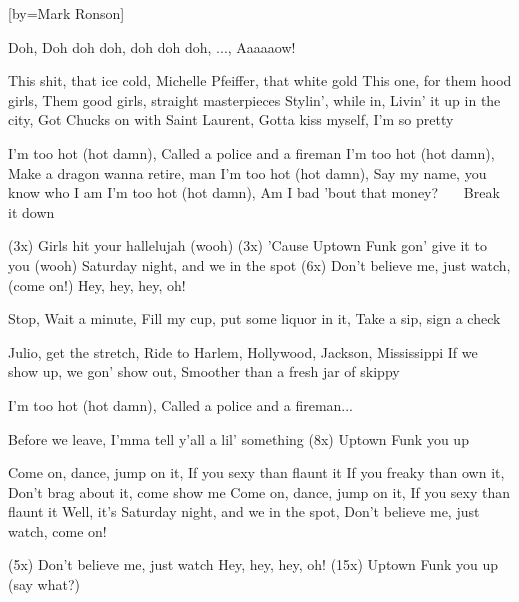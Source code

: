 
[by=Mark Ronson]




\beginverse
Doh, Doh doh doh, doh doh doh, ..., Aaaaaow!
\endverse

\beginverse
This shit, that ice cold, Michelle Pfeiffer, that white gold
This one, for them hood girls, Them good girls, straight masterpieces
Stylin', while in, Livin' it up in the city,
Got Chucks on with Saint Laurent, Gotta kiss myself, I'm so pretty
\endverse

\beginchorus
I'm too hot (hot damn), Called a police and a fireman
I'm too hot (hot damn), Make a dragon wanna retire, man
I'm too hot (hot damn), Say my name, you know who I am
I'm too hot (hot damn), Am I bad 'bout that money?  \ \ \   Break it down

(3x) Girls hit your hallelujah (wooh)
(3x) 'Cause Uptown Funk gon' give it to you (wooh)
Saturday night, and we in the spot
(6x) Don't believe me, just watch, (come on!)
Hey, hey, hey, oh!
\endchorus

\beginverse
Stop, Wait a minute, Fill my cup, put some liquor in it, Take a sip, sign a check

Julio, get the stretch, Ride to Harlem, Hollywood, Jackson, Mississippi
If we show up, we gon' show out, Smoother than a fresh jar of skippy
\endverse

\beginchorus
I'm too hot (hot damn), Called a police and a fireman...
\endchorus

\beginverse
Before we leave, I'mma tell y'all a lil' something
(8x) Uptown Funk you up

Come on, dance, jump on it, If you sexy than flaunt it
If you freaky than own it, Don't brag about it, come show me
Come on, dance, jump on it, If you sexy than flaunt it
Well, it's Saturday night, and we in the spot, Don't believe me, just watch, come on!
\endverse

\beginchorus
(5x) Don't believe me, just watch
Hey, hey, hey, oh!
(15x) Uptown Funk you up  (say what?)
\endchorus

\endsong
